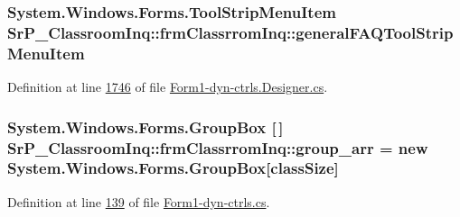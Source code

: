 \hypertarget{class_sr_p___classroom_inq_1_1frm_classrrom_inq_a457cf8afff4e2fd2d76ffa56065350ad}{
\subsubsection[{general\-F\-A\-Q\-Tool\-Strip\-Menu\-Item}]{\setlength{\rightskip}{0pt plus 5cm}\-System.\-Windows.\-Forms.\-Tool\-Strip\-Menu\-Item {\bf \-Sr\-P\-\_\-\-Classroom\-Inq\-::frm\-Classrrom\-Inq\-::general\-F\-A\-Q\-Tool\-Strip\-Menu\-Item}}}
\label{class_sr_p___classroom_inq_1_1frm_classrrom_inq_a457cf8afff4e2fd2d76ffa56065350ad}


\-Definition at line \hyperlink{_form1-dyn-ctrls_8_designer_8cs_source_l01746}{1746} of file \hyperlink{_form1-dyn-ctrls_8_designer_8cs_source}{\-Form1-\/dyn-\/ctrls.\-Designer.\-cs}.

\hypertarget{class_sr_p___classroom_inq_1_1frm_classrrom_inq_a68d2b307c87e71592f6e170c9ce2aad2}{
\subsubsection[{group\-\_\-arr}]{\setlength{\rightskip}{0pt plus 5cm}\-System.\-Windows.\-Forms.\-Group\-Box \mbox{[}$\,$\mbox{]} {\bf \-Sr\-P\-\_\-\-Classroom\-Inq\-::frm\-Classrrom\-Inq\-::group\-\_\-arr} = new \-System.\-Windows.\-Forms.\-Group\-Box\mbox{[}{\bf class\-Size}\mbox{]}}}
\label{class_sr_p___classroom_inq_1_1frm_classrrom_inq_a68d2b307c87e71592f6e170c9ce2aad2}


\-Definition at line \hyperlink{_form1-dyn-ctrls_8cs_source_l00139}{139} of file \hyperlink{_form1-dyn-ctrls_8cs_source}{\-Form1-\/dyn-\/ctrls.\-cs}.

